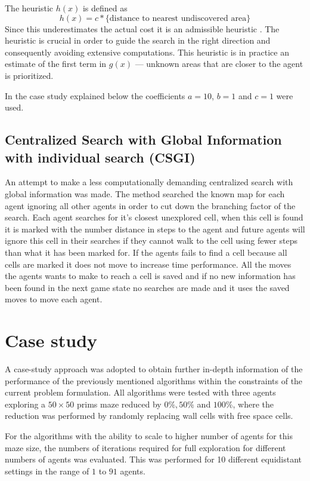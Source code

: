 \documentclass{article}
\begin{document}
The heuristic $h(x)$ is defined as 
%
$$h(x) = c * \text{\{distance to nearest undiscovered area\} }$$
%
Since this underestimates the actual cost it is an admissible heuristic 
\cite{russell2003artificial}. The heuristic is crucial in order to guide the 
search in the right direction and consequently avoiding extensive computations.
This heuristic is in practice an estimate of the first term in $g(x)$ ---
unknown areas that are closer to the agent is prioritized.

In the case study explained below the coefficients $a = 10$, $b = 1$ and $c =
1$ were used.

\subsection{Centralized Search with Global Information with individual search (CSGI)}
An attempt to make a less computationally demanding centralized search with global information was made.
The method searched the known map for each agent ignoring all other agents in order to cut down the branching factor of the search. Each agent searches for it's closest unexplored cell, when this cell is found it is marked with the number distance in steps to the agent and future agents will ignore this cell in their searches if they cannot walk to the cell using fewer steps than what it has been marked for. If the agents fails to find a cell because all cells are marked it does not move to increase time performance. All the moves the agents wants to make to reach a cell is saved and if no new information has been found in the next game state no searches are made and it uses the saved moves to move each agent.

\section{Case study}
A case-study approach was adopted to obtain further in-depth information of the
performance of the previously mentioned algorithms within the constraints of
the current problem formulation. All algorithms were tested with three agents
exploring a $50 \times 50$ prims maze reduced by $0 \%, 50 \% $ and $100\%$, where the
reduction was performed by randomly replacing wall cells with free space cells.


For the algorithms with the ability to scale to higher number of agents for this
maze size, the numbers of iterations required for full exploration for different
numbers of agents was evaluated. This was performed for 10 different equidistant settings in
the range of $1$ to $91$ agents. 
\end{document}
